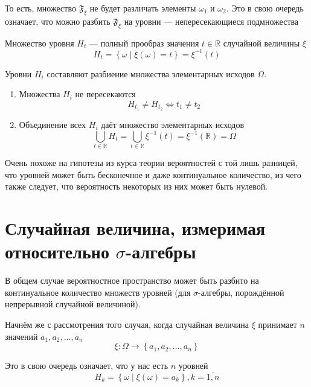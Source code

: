 То есть, множество $\mathfrak{F}_\xi$ не будет различать
элементы $\omega_1$ и $\omega_2$.
Это в свою очередь означает, что можно разбить $\mathfrak{F}_\xi$
на уровни --- непересекающиеся подмножества

\begin{definition}
    Множество уровня $H_t$ --- полный прообраз
    значения $t\in\mathbb{R}$ случайной величины $\xi$
    $$H_t
        = \left\{ \omega \mid \xi\left( \omega \right) = t \right\}
        = \xi^{-1}\left( t \right)$$
\end{definition}

\begin{remark}
    Уровни $H_i$ составляют разбиение множества элементарных исходов $\Omega$.
    \begin{enumerate}
        \item Множества $H_i$ не пересекаются
            $$H_{t_1} \neq H_{t_2} \Leftrightarrow t_1 \neq t_2$$
        \item Объединение всех $H_i$ даёт множество элементарных исходов
            $$\bigcup_{t \in \mathbb{R}} H_t
                = \bigcup_{t \in \mathbb{R}} \xi^{-1}\left( t \right)
                = \xi^{-1}\left( \mathbb{R} \right)
                = \Omega$$
    \end{enumerate}
\end{remark}

Очень похоже на гипотезы из курса теории вероятностей с той лишь разницей,
что уровней может быть бесконечное и даже континуальное количество,
из чего также следует, что вероятность некоторых из них может быть нулевой.

\section{Случайная величина, измеримая относительно $\sigma$-алгебры}
В общем случае вероятностное пространство может быть разбито
на континуальное количество множеств уровней
(для $\sigma$-алгебры, порождённой непрерывной случайной величиной).

Начнём же с рассмотрения того случая,
когда случайная величина $\xi$ принимает $n$ значений
$a_1, a_2, \dots, a_n$
$$\xi: \Omega \rightarrow \left\{ a_1, a_2, \dots, a_n \right\}$$

Это в свою очередь означает, что у нас есть $n$ уровней
$$H_k = \left\{ \omega \mid \xi\left( \omega \right) = a_k \right\},
    k=\overline{1,n}$$

